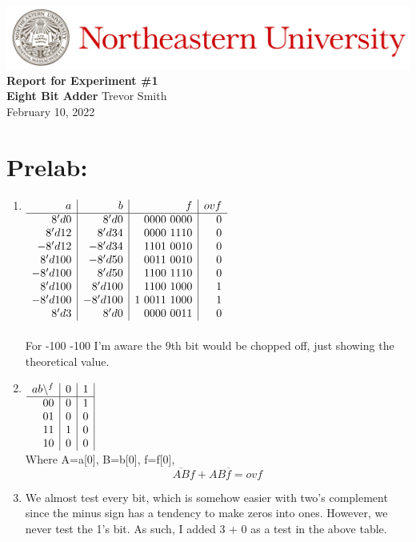 \documentclass[12pt,a4paper]{article}
\begin{document}
\begin{center}
    \includegraphics[width=\textwidth]{./Images/Header.jpeg}
    \vfill
    \textbf{\Large{Report for Experiment \#1\\
    Eight Bit Adder}}
    \vfill
    Trevor Smith\\
    February 10, 2022
    \vfill
\end{center}

\newpage

\section*{Prelab:}

\begin{enumerate}
	\item
$\begin{array}[t]{r|r|r|r}
	a & b & f & ovf \\ \hline
	8'd0    & 8'd0    & 0000\ 0000 & 0 \\
	8'd12   & 8'd34   & 0000\ 1110 & 0 \\
	-8'd12  & -8'd34  & 1101\ 0010 & 0 \\
	8'd100  & -8'd50  & 0011\ 0010 & 0 \\
	-8'd100 & 8'd50   & 1100\ 1110 & 0 \\
	8'd100  & 8'd100  & 1100\ 1000 & 1 \\
	-8'd100 & -8'd100 & 1\ 0011\ 1000 & 1 \\
	8'd3    & 8'd0    & 0000\ 0011 & 0 \\
 \end{array}$ \\ \\
 For -100 -100 I'm aware the 9th bit would be chopped off, just showing
 the theoretical value.
 
 	\item
$\begin{array}[t]{r|c|c|}
	ab \setminus^f & 0 & 1 \\ \hline
	00 & 0 & 1 \\
	01 & 0 & 0 \\
	11 & 1 & 0 \\
	10 & 0 & 0 \\
\end{array}$ \\
Where A=a[0], B=b[0], f=f[0], \\
$$ \overline{AB}f + AB\overline{f} = ovf $$

	\item
		We almost test every bit, which is somehow easier with two's complement
		since the minus sign has a tendency to make zeros into ones. However,
		we never test the 1's bit. As such, I added 3 + 0 as a test in the above
		table.
\end{enumerate}
\end{document}
